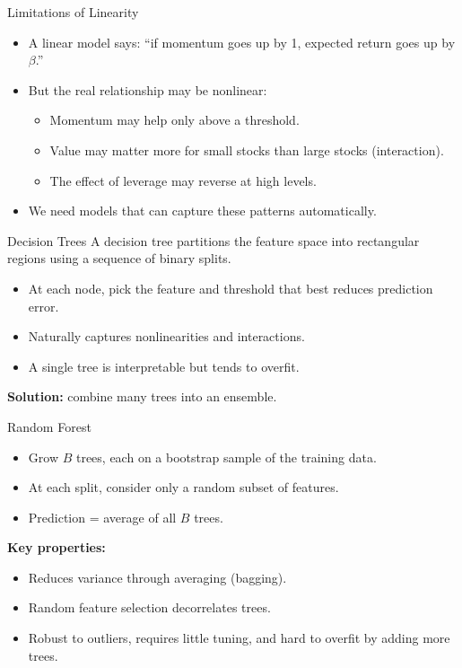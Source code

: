 \documentclass[aspectratio=169,t]{beamer}
\begin{document}
\begin{frame}{Limitations of Linearity}
\begin{itemize}
\item A linear model says: ``if momentum goes up by 1, expected return goes up by $\beta$.''
\item But the real relationship may be \alert{nonlinear}:
\begin{itemize}
\item Momentum may help only above a threshold.
\item Value may matter more for small stocks than large stocks (interaction).
\item The effect of leverage may reverse at high levels.
\end{itemize}
\item We need models that can capture these patterns automatically.
\end{itemize}
\end{frame}


\begin{frame}{Decision Trees}
A decision tree partitions the feature space into rectangular regions using a sequence of binary splits.

\vspace{0.15cm}
\begin{itemize}
\item At each node, pick the feature and threshold that best reduces prediction error.
\item Naturally captures \alert{nonlinearities} and \alert{interactions}.
\item A single tree is interpretable but tends to overfit.
\end{itemize}

\vspace{0.15cm}
\textbf{Solution:} combine many trees into an \alert{ensemble}.
\end{frame}

\begin{frame}{Random Forest}
\begin{itemize}
\item Grow $B$ trees, each on a \alert{bootstrap sample} of the training data.
\item At each split, consider only a \alert{random subset} of features.
\item Prediction = average of all $B$ trees.
\end{itemize}

\vspace{0.3cm}
\textbf{Key properties:}
\begin{itemize}
\item Reduces variance through averaging (bagging).
\item Random feature selection decorrelates trees.
\item Robust to outliers, requires little tuning, and hard to overfit by adding more trees.
\end{itemize}
\end{frame}
\end{document}
